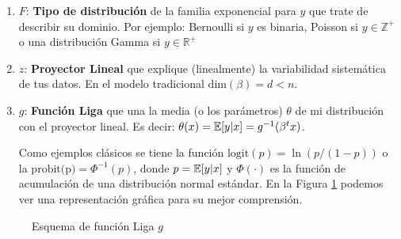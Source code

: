 \documentclass[../Main/Main.tex]{subfiles}
\begin{document}
\begin{enumerate}
	\item $F$: \textbf{Tipo de distribución} de la familia exponencial para $y$ que trate de describir su dominio. Por ejemplo: Bernoulli si $y$ es binaria, Poisson si $y \in \mathbb{Z}^+$ o una distribución Gamma si $y \in \mathbb{R}^+$
	\item $z$: \textbf{Proyector Lineal} que explique (linealmente) la variabilidad sistemática de tus datos. En el modelo tradicional $\text{dim}(\beta) = d < n.$
	\item $g$: \textbf{Función Liga} que una la media (o los parámetros) $\theta$ de mi distribución con el proyector lineal. Es decir: $\theta(x) = \mathbb{E}[y|x] = g^{-1}(\beta^tx)$. 
	
	Como ejemplos clásicos se tiene la función $\text{logit}(p) = \ln(p/(1-p))$ o la $\text{probit(p)} = \Phi^{-1}(p)$, donde $p = \mathbb{E}[y|x]$ y $\Phi(\cdot)$ es la función de acumulación de una distribución normal estándar. En la Figura \ref{fig:DiagramaFuncLiga} podemos ver una representación gráfica para su mejor comprensión.
\end{enumerate}

\begin{figure}[h]
\centering
{}
\caption{Esquema de función Liga $g$}
\label{fig:DiagramaFuncLiga}
\end{figure}
\end{document}
